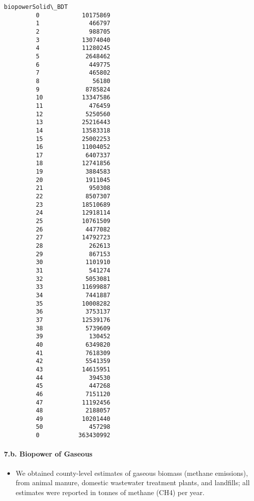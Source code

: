 \documentclass[11pt]{article}
\providecommand{\tightlist}{%
      \setlength{\itemsep}{0pt}\setlength{\parskip}{0pt}}
\begin{document}
\begin{Verbatim}[commandchars=\\\{\}]
             biopowerSolid\_BDT  
         0            10175869  
         1              466797  
         2              988705  
         3            13074040  
         4            11280245  
         5             2648462  
         6              449775  
         7              465802  
         8               56180  
         9             8785824  
         10           13347586  
         11             476459  
         12            5250560  
         13           25216443  
         14           13583318  
         15           25002253  
         16           11004052  
         17            6407337  
         18           12741856  
         19            3884583  
         20            1911045  
         21             950308  
         22            8507307  
         23           18510689  
         24           12918114  
         25           10761509  
         26            4477082  
         27           14792723  
         28             262613  
         29             867153  
         30            1101910  
         31             541274  
         32            5053081  
         33           11699887  
         34            7441887  
         35           10008282  
         36            3753137  
         37           12539176  
         38            5739609  
         39             130452  
         40            6349820  
         41            7618309  
         42            5541359  
         43           14615951  
         44             394530  
         45             447268  
         46            7151120  
         47           11192456  
         48            2188057  
         49           10201440  
         50             457298  
         0           363430992  
\end{Verbatim}
            
    \paragraph{7.b. Biopower of Gaseous}\label{b.-biopower-of-gaseous}

\begin{itemize}
\tightlist
\item
  We obtained county-level estimates of gaseous biomass (methane
  emissions), from animal manure, domestic wastewater treatment plants,
  and landfills; all estimates were reported in tonnes of methane (CH4)
  per year.
\end{itemize}
\end{document}
